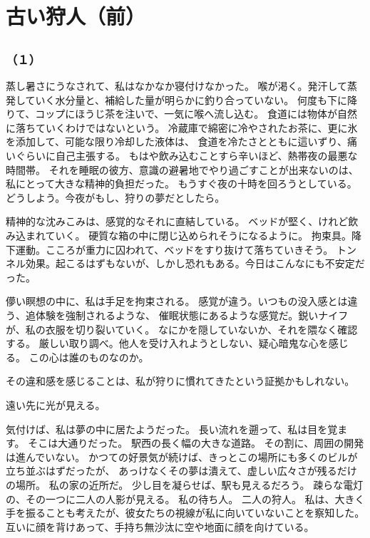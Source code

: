 \documentclass[../IHMain]{subfiles}
\begin{document}
\chapter{古い狩人（前）}
\section{}
\subsection*{（１）}
蒸し暑さにうなされて、私はなかなか寝付けなかった。
喉が渇く。発汗して蒸発していく水分量と、補給した量が明らかに釣り合っていない。
何度も下に降りて、コップにほうじ茶を注いで、一気に喉へ流し込む。
食道には物体が自然に落ちていくわけではないという。
冷蔵庫で綿密に冷やされたお茶に、更に氷を添加して、可能な限り冷却した液体は、
食道を冷たさとともに這いずり、痛いぐらいに自己主張する。
もはや飲み込むことすら辛いほど、熱帯夜の最悪な時間帯。
それを睡眠の彼方、意識の避暑地でやり過ごすことが出来ないのは、私にとって大きな精神的負担だった。
もうすぐ夜の十時を回ろうとしている。どうしよう。今夜がもし、狩りの夢だとしたら。

精神的な沈みこみは、感覚的なそれに直結している。
ベッドが堅く、けれど飲み込まれていく。
硬質な箱の中に閉じ込められそうになるように。
拘束具。降下運動。こころが重力に囚われて、ベッドをすり抜けて落ちていきそう。
トンネル効果。起こるはずもないが、しかし恐れもある。今日はこんなにも不安定だった。

儚い瞑想の中に、私は手足を拘束される。
感覚が違う。いつもの没入感とは違う、追体験を強制されるような、
催眠状態にあるような感覚だ。鋭いナイフが、私の衣服を切り裂いていく。
なにかを隠していないか、それを隈なく確認する。
厳しい取り調べ。他人を受け入れようとしない、疑心暗鬼な心を感じる。
この心は誰のものなのか。

その違和感を感じることは、私が狩りに慣れてきたという証拠かもしれない。

遠い先に光が見える。

気付けば、私は夢の中に居たようだった。
長い流れを遡って、私は目を覚ます。
そこは大通りだった。
駅西の長く幅の大きな道路。
その割に、周囲の開発は進んでいない。
かつての好景気が続けば、きっとこの場所にも多くのビルが立ち並ぶはずだったが、
あっけなくその夢は潰えて、虚しい広々さが残るだけの場所。
私の家の近所だ。
少し目を凝らせば、駅も見えるだろう。
疎らな電灯の、その一つに二人の人影が見える。
私の待ち人。
二人の狩人。
私は、大きく手を振ることも考えたが、彼女たちの視線が私に向いていないことを察知した。
互いに顔を背けあって、手持ち無沙汰に空や地面に顔を向けている。
\end{document}
